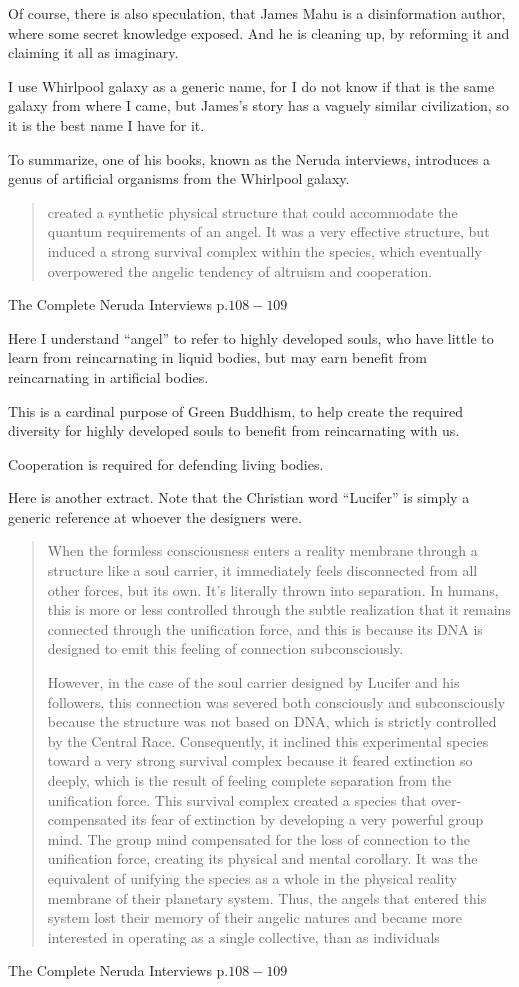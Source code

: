 \documentclass{report}
\begin{document}
Of course, there is also speculation, that James Mahu is a disinformation
author, where some secret knowledge exposed. And he is cleaning up, by reforming
it and claiming it all as imaginary. 

I use Whirlpool galaxy as a generic name, for I do not know if that is the same
galaxy from where I came, but James's story has a vaguely similar civilization,
so it is the best name I have for it.

To summarize, one of his books, known as the Neruda interviews, introduces a
genus of artificial organisms from the Whirlpool galaxy.

\blockquote{created  a  synthetic  physical  structure  that  could  accommodate
the  quantum requirements of an angel. It was a very effective structure, but
induced a strong survival complex  within  the  species,  which  eventually
overpowered  the  angelic  tendency  of altruism and cooperation.}{The Complete Neruda Interviews p.$108-109$ 
\cite{neruda}}

Here I understand ``angel'' to refer to highly developed souls, who have little
to learn from reincarnating in liquid bodies, but may earn benefit from
reincarnating in artificial bodies.

This is a cardinal purpose of Green Buddhism, to help create the required
diversity for highly developed souls to benefit from reincarnating with us.

Cooperation is required for defending living bodies.

Here is another extract. Note that the Christian word ``Lucifer'' is simply a
generic reference at whoever the designers were.

\blockquote{When the formless consciousness enters a reality membrane through a
 structure like a soul carrier, it immediately feels disconnected from all other
forces, but its own. It’s literally thrown into separation. In humans, this is
more or less controlled through the subtle realization that it remains connected
through the unification force, and  this  is  because  its  DNA  is  designed
to  emit this  feeling  of  connection  subconsciously.

However, in the case of the soul carrier designed by Lucifer and his followers,
this connection was severed both consciously and subconsciously because the 
structure was not based on DNA, which is strictly controlled by the Central 
Race. Consequently, it inclined this experimental species toward a very
strong survival complex because it feared extinction so deeply, which is
the result of feeling complete separation from the unification force. This
survival complex created a species that over-compensated its fear of
extinction by developing a very powerful group mind. The group mind
compensated for the loss of connection to the unification force,
creating its physical and mental corollary. It was the equivalent of unifying
the species as a whole in the physical reality membrane of their planetary
system. Thus, the angels that entered this system lost their memory of
their angelic natures and became more interested in operating as a single
collective, than as individuals}{The Complete Neruda Interviews p.$108-109$ 
\cite{neruda}}
\end{document}
